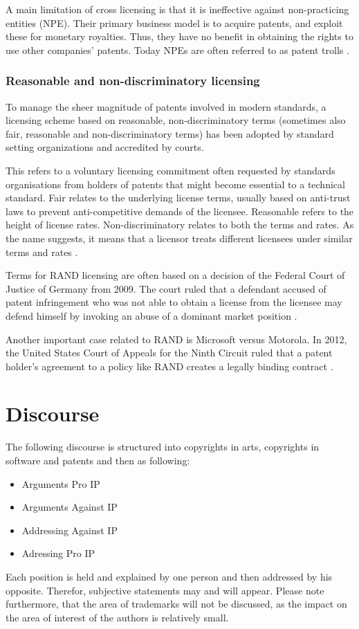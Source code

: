 \documentclass[a4paper]{report}
\begin{document}
A main limitation of cross licensing is that it is ineffective against non-practicing entities (NPE). Their primary business model is to acquire patents, and exploit these for monetary royalties. Thus, they have no benefit in obtaining the rights to use other companies' patents. Today NPEs are often referred to as patent trolls \parencite{PatentTroll}. 

\subsection{Reasonable and non-discriminatory licensing}
To manage the sheer magnitude of patents involved in modern standards, a licensing scheme based on reasonable, non-discriminatory terms (sometimes also fair, reasonable and non-discriminatory terms) has been adopted by standard setting organizations and accredited by courts.

This refers to a voluntary licensing commitment often requested by standards organisations from holders of patents that might become essential to a technical standard. Fair relates to the underlying license terms, usually based on anti-trust laws to prevent anti-competitive demands of the licensee. Reasonable refers to the height of license rates. Non-discriminatory relates to both the terms and rates. As the name suggests, it means that a licensor treats different licensees under similar terms and rates \parencite{WikiRAND}. 

Terms for RAND licensing are often based on a decision of the Federal Court of Justice of Germany from 2009. The court ruled that a defendant accused of patent infringement who was not able to obtain a license from the licensee may defend himself by invoking an abuse of a dominant market position \parencite{OrangeBook}.
 
Another important case related to RAND is Microsoft versus Motorola. In 2012, the United States Court of Appeals for the Ninth Circuit ruled that a patent holder's agreement to a policy like RAND creates a legally binding contract \parencite{MicrosoftVsMotorola}.

\chapter{Discourse}
\label{ch:Disc}
The following discourse is structured into copyrights in arts, copyrights in software and patents and then as following:
\begin{itemize}
	\item Arguments Pro IP
	\item Arguments Against IP
	\item Addressing Against IP
	\item Adressing Pro IP
\end{itemize}
Each position is held and explained by one person and then addressed by his opposite. Therefor, subjective statements may and will appear. Please note furthermore, that the area of trademarks will not be discussed, as the impact on the area of interest of the authors is relatively small.
\end{document}
